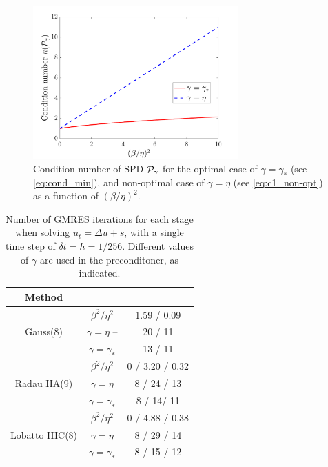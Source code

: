 \documentclass[a4paper,10pt]{article}
\begin{document}
{\begin{figure}[h!]
\centering
\includegraphics[width = 0.7\textwidth]{figures/conds_spsd}
\caption{Condition number of SPD ${\cal P}_{\gamma}$ for the optimal case of $\gamma = \gamma_*$ (see \eqref{eq:cond_min}), and non-optimal case of $\gamma = \eta$ (see \eqref{eq:c1_non-opt}) as a function of $(\beta/\eta)^2$. }
\label{fig:conds}
\end{figure}

\renewcommand{\tabcolsep}{4pt}
\renewcommand{\arraystretch}{1.15}
\begin{table}[!ht]
  \centering
  \begin{tabular}{| c | c | c |}  %
  \hline
Method & &  \\ \hline
\multirow{ 3}{*}{Gauss(8)}
&$\beta^2/\eta^2$ & 1.59 / 0.09 \\
&$\gamma = \eta$  -- & 20 / 11\\
&$\gamma = \gamma_*$ & 13 / 11\\ \hline
\multirow{ 3}{*}{Radau IIA(9)}
&$\beta^2/\eta^2$ & 0 / 3.20 / 0.32	\\
&$\gamma = \eta$ &  8 / 24 / 13\\
&$\gamma = \gamma_*$ & 8 / 14/ 11 \\ \hline
\multirow{ 3}{*}{Lobatto IIIC(8)}
&$\beta^2/\eta^2$ & 0 / 4.88 / 0.38 \\
&$\gamma = \eta$ & 8 / 29 / 14\\
&$\gamma = \gamma_*$ & 8 / 15 / 12\\
  \hline
  \end{tabular}
  \caption{
Number of GMRES iterations for each stage when solving $u_t = \Delta u + s$, with a single time step of $\delta t = h = 1/256$. Different values of $\gamma$ are used in the preconditoner, as indicated.
}
\label{tab:cond_iters}
\end{table}

}
\end{document}

